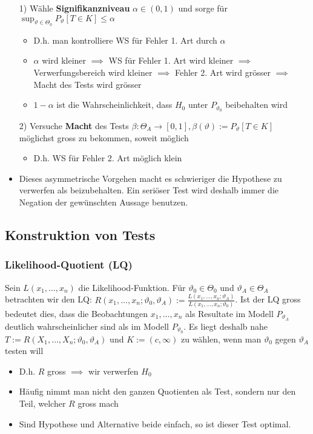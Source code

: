 \begin{itemize}
        \begin{itemize}
            \item[1)] Wähle \textbf{Signifikanzniveau} $\alpha \in (0, 1)$ und sorge für $\sup_{\vartheta \in \Theta_0} P_\vartheta[T \in K] \le \alpha$
                \begin{itemize}
                    \item D.h. man kontrolliere WS für Fehler 1. Art durch $\alpha$
                    \item $\alpha$ wird kleiner $\implies$ WS für Fehler 1. Art wird kleiner $\implies$ Verwerfungsbereich wird kleiner $\implies$ Fehler 2. Art wird grösser $\implies$ Macht des Tests wird grösser
                    \item $1 - \alpha$ ist die Wahrscheinlichkeit, dass $H_0$ unter $P_{\vartheta_0}$ beibehalten wird
                \end{itemize}
            \item[2)] Versuche \textbf{Macht} des Tests $\beta: \Theta_A \to [0, 1], \beta(\vartheta) := P_\vartheta[T \in K]$ möglichst gross zu bekommen, soweit möglich
                \begin{itemize}
                    \item D.h. WS für Fehler 2. Art möglich klein
                \end{itemize}
            \item Dieses asymmetrische Vorgehen macht es schwieriger die Hypothese zu verwerfen als beizubehalten. Ein seriöser Test wird deshalb immer die Negation der gewünschten Aussage benutzen.
        \end{itemize}
\end{itemize}

\subsection{Konstruktion von Tests}
\subsubsection{Likelihood-Quotient (LQ)}
Sein $L(x_1, \dots, x_n)$ die Likelihood-Funktion. Für $\vartheta_0 \in \Theta_0$ und $\vartheta_A \in \Theta_A$ betrachten wir den LQ: $R(x_1, \dots, x_n; \vartheta_0, \vartheta_A) := \frac{L(x_1, \dots, x_n; \vartheta_A)}{L(x_1, \dots, x_n; \vartheta_0)}$. Ist der LQ gross bedeutet dies, dass die Beobachtungen $x_1, \dots, x_n$ als Resultate im Modell $P_{\vartheta_A}$ deutlich wahrscheinlicher sind als im Modell $P_{\vartheta_0}$. Es liegt deshalb nahe $T:= R(X_1, \dots, X_n; \vartheta_0, \vartheta_A)$ und $K := (c, \infty)$ zu wählen, wenn man $\vartheta_0$ gegen $\vartheta_A$ testen will
\begin{itemize}
    \item D.h. $R$ gross $\implies$ wir verwerfen $H_0$
    \item Häufig nimmt man nicht den ganzen Quotienten als Test, sondern nur den Teil, welcher $R$ gross mach
    \item Sind Hypothese und Alternative beide einfach, so ist dieser Test optimal.
\end{itemize}

